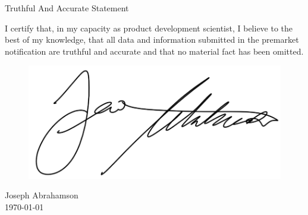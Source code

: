 \newpage
{}
\singlespacing
\begin{center}
  \large{Truthful And Accurate Statement}
\end{center}

\onehalfspacing

I certify that, in my capacity as product development scientist, I
believe to the best of my knowledge, that all data and information
submitted in the premarket notification are truthful and accurate and
that no material fact has been omitted.

\begin{figure}[H]
  \includegraphics[width=0.35\linewidth]{imgs/ja-sig}
\end{figure}

\noindent Joseph Abrahamson \\
\today


